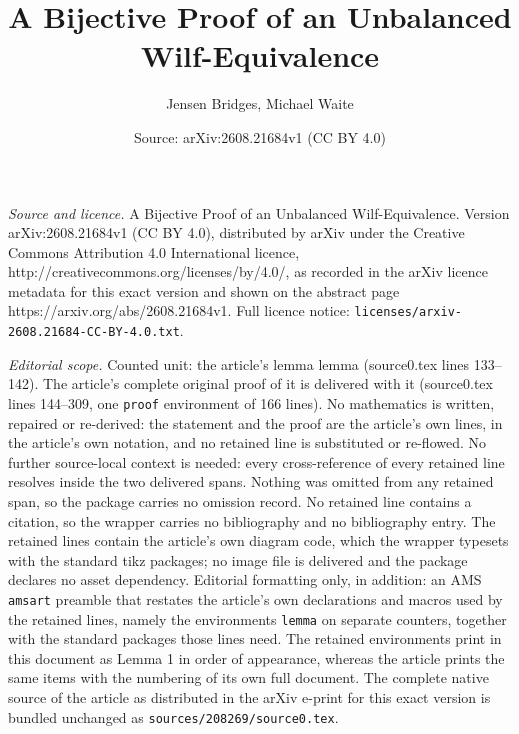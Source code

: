 \documentclass[10pt,a4paper]{amsart}
\title{A Bijective Proof of an Unbalanced Wilf-Equivalence}
\author{Jensen Bridges, Michael Waite}
\date{Source: arXiv:2608.21684v1 (CC BY 4.0)}
\begin{document}
\maketitle

\noindent\emph{Source and licence.} A Bijective Proof of an Unbalanced Wilf-Equivalence. Version arXiv:2608.21684v1 (CC BY 4.0), distributed by arXiv under the Creative Commons Attribution 4.0 International licence, http://creativecommons.org/licenses/by/4.0/, as recorded in the arXiv licence metadata for this exact version and shown on the abstract page https://arxiv.org/abs/2608.21684v1. Full licence notice: \texttt{licenses/arxiv-2608.21684-CC-BY-4.0.txt}.\par\smallskip

\noindent\textit{Editorial scope.} Counted unit: the article's lemma lemma (source0.tex lines 133--142). The article's complete original proof of it is delivered with it (source0.tex lines 144--309, one \texttt{proof} environment of 166 lines). No mathematics is written, repaired or re-derived: the statement and the proof are the article's own lines, in the article's own notation, and no retained line is substituted or re-flowed.  No further source-local context is needed: every cross-reference of every retained line resolves inside the two delivered spans.  Nothing was omitted from any retained span, so the package carries no omission record.  No retained line contains a citation, so the wrapper carries no bibliography and no bibliography entry.  The retained lines contain the article's own diagram code, which the wrapper typesets with the standard tikz packages; no image file is delivered and the package declares no asset dependency.  Editorial formatting only, in addition: an AMS \texttt{amsart} preamble that restates the article's own declarations and macros used by the retained lines, namely the environments \texttt{lemma} on separate counters, together with the standard packages those lines need.  The retained environments print in this document as Lemma 1 in order of appearance, whereas the article prints the same items with the numbering of its own full document.  The complete native source of the article as distributed in the arXiv e-print for this exact version is bundled unchanged as \texttt{sources/208269/source0.tex}.
\end{document}

